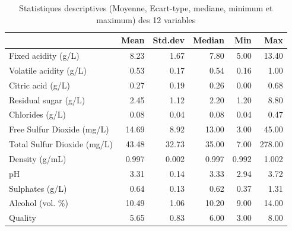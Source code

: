 \documentclass[11pt,a4paper]{article}
\begin{document}
\begin{table}[ht]
	\centering
	\begin{tabular}{lrrrrr}
		\hline
		& Mean & Std.dev & Median & Min & Max \\ 
		\hline
		Fixed acidity (g/L) & 8.23 & 1.67 & 7.80 & 5.00 & 13.40 \\ 
		Volatile acidity (g/L) & 0.53 & 0.17 & 0.54 & 0.16 & 1.00 \\ 
		Citric acid (g/L) & 0.27 & 0.19 & 0.26 & 0.00 & 0.68 \\ 
		Residual sugar (g/L) & 2.45 & 1.12 & 2.20 & 1.20 & 8.80 \\ 
		Chlorides (g/L) & 0.08 & 0.04 & 0.08 & 0.04 & 0.47 \\ 
		Free Sulfur Dioxide (mg/L) & 14.69 & 8.92 & 13.00 & 3.00 & 45.00 \\ 
		Total Sulfur Dioxide (mg/L) & 43.48 & 32.73 & 35.00 & 7.00 & 278.00 \\ 
		Density (g/mL) & 0.997 & 0.002 & 0.997 & 0.992 & 1.002\\ 
		pH & 3.31 & 0.14 & 3.33 & 2.94 & 3.72 \\ 
		Sulphates (g/L) & 0.64 & 0.13 & 0.62 & 0.37 & 1.31 \\ 
		Alcohol (vol. \%) & 10.49 & 1.06 & 10.20 & 9.00 & 14.00 \\ 
		Quality & 5.65 & 0.83 & 6.00 & 3.00 & 8.00 \\ 
		\hline
	\end{tabular}
\caption{Statistiques descriptives (Moyenne, Ecart-type, mediane, minimum et maximum) des 12 variables}
\label{table:statdesc}
\end{table}
\end{document}
